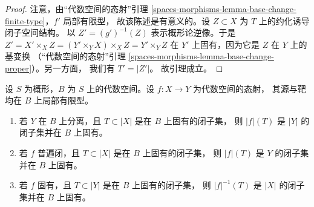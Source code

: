 \begin{proof}
注意，由“代数空间的态射”引理
\ref{spaces-morphisms-lemma-base-change-finite-type}，$f'$ 局部有限型，
故该陈述是有意义的。设 $Z \subset X$ 为 $T$ 上的约化诱导闭子空间结构。
以 $Z' = (g')^{-1}(Z)$ 表示概形论逆像。于是
$Z' = X' \times_X Z = (Y' \times_Y X) \times_X Z = Y' \times_Y Z$
在 $Y'$ 上固有，因为它是 $Z$ 在 $Y$ 上的基变换
（“代数空间的态射”引理
\ref{spaces-morphisms-lemma-base-change-proper}）。另一方面，
我们有 $T' = |Z'|$。 %
故引理成立。
\end{proof}

\begin{lemma}
\label{lemma-functoriality-closed-proper-over-base}
设 $S$ 为概形，$B$ 为 $S$ 上的代数空间。设 $f : X \to Y$ 为代数空间的态射，
其源与靶均在 $B$ 上局部有限型。
\begin{enumerate}
\item 若 $Y$ 在 $B$ 上分离，且 $T \subset |X|$ 是在 $B$ 上固有的闭子集，
则 $|f|(T)$ 是 $|Y|$ 的闭子集并在 $B$ 上固有。
\item 若 $f$ 普遍闭，且 $T \subset |X|$ 是在 $B$ 上固有的闭子集，
则 $|f|(T)$ 是 $Y$ 的闭子集并在 $B$ 上固有。 %
\item 若 $f$ 固有，且 $T \subset |Y|$ 是在 $B$ 上固有的闭子集，
则 $|f|^{-1}(T)$ 是 $|X|$ 的闭子集并在 $B$ 上固有。
\end{enumerate}
\end{lemma}

